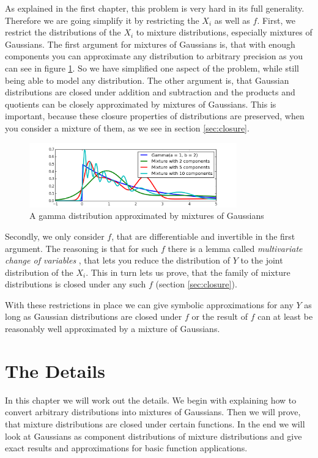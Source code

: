 \documentclass[11pt,a4paper]{book}
\begin{document}
As explained in the first chapter, this problem is very hard in its full
generality. Therefore we are going simplify it by restricting the $X_{i}$ as
well as $f$. First, we restrict the distributions of the $X_{i}$ to mixture
distributions, especially mixtures of Gaussians. The first argument for mixtures
of Gaussians is, that with enough components you can approximate any
distribution to arbitrary precision as you can see in figure
\ref{fig:idea-em}. So we have simplified one aspect of the problem, while still
being able to model any distribution. The other argument is, that Gaussian
distributions are closed under addition and subtraction and the products and
quotients can be closely approximated by mixtures of Gaussians. This is
important, because these closure properties of distributions are preserved, when
you consider a mixture of them, as we see in section \ref{sec:closure}.
\begin{figure}[h]
  \centering
  \includegraphics[width=0.8\textwidth]{thesis/idea/em}
  \caption{A gamma distribution approximated by mixtures of Gaussians}
  \label{fig:idea-em}
\end{figure}

Secondly, we only consider $f$, that are differentiable and invertible in the
first argument. The reasoning is that for such $f$ there is a lemma called
\emph{multivariate change of variables} \cite[chapter~2.6.2.1]{murphy}, that
lets you reduce the distribution of $Y$ to the joint distribution of the
$X_{i}$. This in turn lets us prove, that the family of mixture distributions is
closed under any such $f$ (section \ref{sec:closure}).

With these restrictions in place we can give symbolic approximations for any $Y$
as long as Gaussian distributions are closed under $f$ or the result of $f$ can
at least be reasonably well approximated by a mixture of Gaussians.

\chapter{The Details}
\label{ch:theory}

In this chapter we will work out the details. We begin with explaining how to
convert arbitrary distributions into mixtures of Gaussians. Then we will prove,
that mixture distributions are closed under certain functions. In the end we
will look at Gaussians as component distributions of mixture distributions and
give exact results and approximations for basic function applications.
\end{document}
